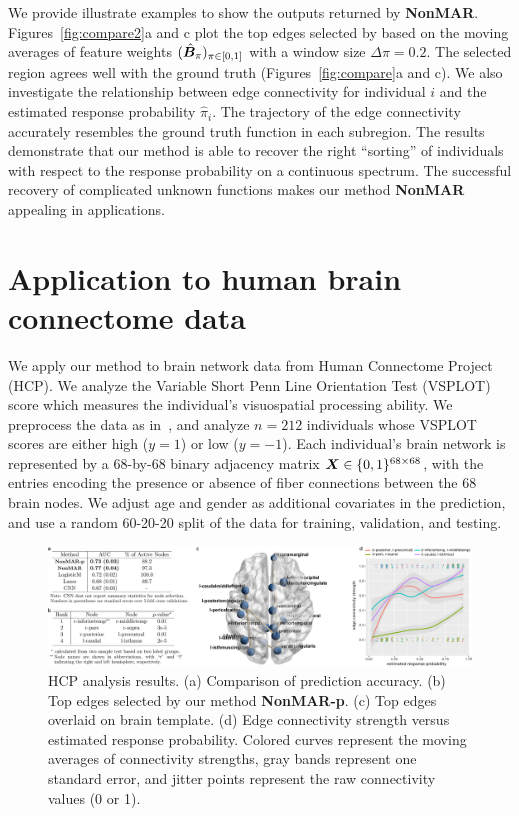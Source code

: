 \documentclass[11pt]{article}
\theoremstyle{definition}
\def\NonparaM{\text{\bf \small NonMAR }}
\begin{document}
We provide illustrate examples to show the outputs returned by {\bf \small NonMAR}. Figures~\ref{fig:compare2}a and c plot the top edges selected by \NonparaM based on the moving averages of feature weights $(\hat {\bm B}_\pi)_{\pi\in[0,1]}$ with a window size $\Delta \pi = 0.2$. The selected region agrees well with the ground truth (Figures~\ref{fig:compare}a and c). We also investigate the relationship between edge connectivity for individual $i$ and the estimated response probability $\hat \pi_i$. The trajectory of the edge connectivity accurately resembles the ground truth function in each subregion. The results demonstrate that our method is able to recover the right ``sorting'' of individuals with respect to the response probability on a continuous spectrum. 
The successful recovery of complicated unknown functions makes our method {\bf \small NonMAR} appealing in applications. 

\vspace{-.3cm}
\section{Application to human brain connectome data}
\vspace{-.5cm}

We apply our method to brain network data from Human Connectome Project (HCP). We analyze the Variable Short Penn Line Orientation Test (VSPLOT) score which measures the individual's visuospatial processing ability. We preprocess the data as in~\cite{wang2019common}, and analyze $n=212$ individuals whose VSPLOT scores are either high ($y=1$) or low ($y=-1$). Each individual's brain network is represented by a 68-by-68 binary adjacency matrix $\bm X\in\{0,1\}^{68\times 68}$, with the entries encoding the presence or absence of fiber connections between the 68 brain nodes. We adjust age and gender as additional covariates in the prediction, and use a random 60-20-20 split of the data for training, validation, and testing. 

\begin{figure}[H]
    \centering
       \includegraphics[width=\textwidth]{HCP_combined.pdf}
 \caption{HCP analysis results. (a) Comparison of prediction accuracy. (b) Top edges selected by our method {\scriptsize \bf NonMAR-p}. (c) Top edges overlaid on brain template. (d) Edge connectivity strength versus estimated response probability. Colored curves represent the moving averages of connectivity strengths, gray bands represent one standard error, and jitter points represent the raw connectivity values (0 or 1). }\label{fig:real}
 \vspace{-.7cm}
\end{figure}
\end{document}
